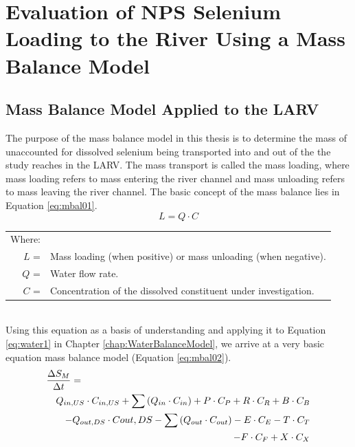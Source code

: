 \renewcommand{\thechapter}{5}
\chapter{Evaluation of NPS Selenium Loading to the River Using a Mass Balance Model}
\label{chap:MassBalanceModel}

\begin{linenumbers}
\section{Mass Balance Model Applied to the LARV}
\label{sec:AppliedMassModel}

The purpose of the mass balance model in this thesis is to determine the mass of unaccounted for dissolved selenium being transported into and out of the the study reaches in the LARV.  The mass transport is called the mass loading, where mass loading refers to mass entering the river channel and mass unloading refers to mass leaving the river channel.  The basic concept of the mass balance lies in Equation \ref{eq:mbal01}.
\begin{equation}
	\label{eq:mbal01}
	L=Q \cdot C
\end{equation}
\begin{tabular}{r p{5.5in}}
		Where:  \\
		$ L $ = & Mass loading (when positive) or mass unloading (when negative).\\
		$ Q $ = & Water flow rate.\\
		$ C $ = & Concentration of the dissolved constituent under investigation.\\
\end{tabular}\\

Using this equation as a basis of understanding and applying it to Equation \ref{eq:water1} in Chapter \ref{chap:WaterBalanceModel}, we arrive at a very basic equation mass balance model (Equation \ref{eq:mbal02}).
\begin{eqnarray}
	\label{eq:mbal02}
	\lefteqn{\frac{\Delta S_M}{\Delta t}=} \\
	\nonumber & &  Q_{in,US} \cdot C_{in,US} + \sum \left( Q_{in} \cdot C_{in} \right) + P \cdot C_P + R \cdot C_R  + B \cdot C_B\\
	\nonumber & & - Q_{out,DS} \cdot C{out,DS} - \sum \left( Q_{out} \cdot C_{out} \right) - E \cdot C_E - T \cdot C_T \\
	\nonumber & & - F \cdot C_F + X \cdot C_X
\end{eqnarray}\\


\end{linenumbers}
